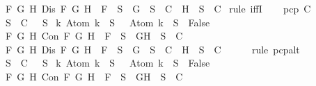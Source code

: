 \begin{isabellebody}
{\isasymand}\ {\isacharparenleft}{\isasymforall}F\ G\ H{\isachardot}\ Dis\ F\ G\ H\ {\isasymlongrightarrow}\ F\ {\isasymin}\ S\ {\isasymlongrightarrow}\ {\isacharbraceleft}G{\isacharbraceright}\ {\isasymunion}\ S\ {\isasymin}\ C\ {\isasymor}\ {\isacharbraceleft}H{\isacharbraceright}\ {\isasymunion}\ S\ {\isasymin}\ C{\isacharparenright}{\isacharparenright}{\isachardoublequoteclose}\isanewline
%
\isadelimproof
%
\endisadelimproof
%
\isatagproof
{}\isamarkupfalse%
\ {\isacharparenleft}rule\ iffI{\isacharparenright}\isanewline
\ \ \isamarkupfalse%
\ {\isachardoublequoteopen}pcp\ C{\isachardoublequoteclose}\isanewline
\ \ \isamarkupfalse%
\ {\isachardoublequoteopen}{\isasymforall}S\ {\isasymin}\ C{\isachardot}\ {\isasymbottom}\ {\isasymnotin}\ S\isanewline
{\isasymand}\ {\isacharparenleft}{\isasymforall}k{\isachardot}\ Atom\ k\ {\isasymin}\ S\ {\isasymlongrightarrow}\ \isactrlbold {\isasymnot}\ {\isacharparenleft}Atom\ k{\isacharparenright}\ {\isasymin}\ S\ {\isasymlongrightarrow}\ False{\isacharparenright}\isanewline
{\isasymand}\ {\isacharparenleft}{\isasymforall}F\ G\ H{\isachardot}\ Con\ F\ G\ H\ {\isasymlongrightarrow}\ F\ {\isasymin}\ S\ {\isasymlongrightarrow}\ {\isacharbraceleft}G{\isacharcomma}H{\isacharbraceright}\ {\isasymunion}\ S\ {\isasymin}\ C{\isacharparenright}\isanewline
{\isasymand}\ {\isacharparenleft}{\isasymforall}F\ G\ H{\isachardot}\ Dis\ F\ G\ H\ {\isasymlongrightarrow}\ F\ {\isasymin}\ S\ {\isasymlongrightarrow}\ {\isacharbraceleft}G{\isacharbraceright}\ {\isasymunion}\ S\ {\isasymin}\ C\ {\isasymor}\ {\isacharbraceleft}H{\isacharbraceright}\ {\isasymunion}\ S\ {\isasymin}\ C{\isacharparenright}{\isachardoublequoteclose}\isanewline
\ \ \ \ \isamarkupfalse%
\ {\isacharparenleft}rule\ pcp{\isacharunderscore}alt{}{\isacharparenright}\isanewline
{}\isamarkupfalse%
\isanewline
\ \ \isamarkupfalse%
\ {\isachardoublequoteopen}{\isasymforall}S\ {\isasymin}\ C{\isachardot}\ {\isasymbottom}\ {\isasymnotin}\ S\isanewline
{\isasymand}\ {\isacharparenleft}{\isasymforall}k{\isachardot}\ Atom\ k\ {\isasymin}\ S\ {\isasymlongrightarrow}\ \isactrlbold {\isasymnot}\ {\isacharparenleft}Atom\ k{\isacharparenright}\ {\isasymin}\ S\ {\isasymlongrightarrow}\ False{\isacharparenright}\isanewline
{\isasymand}\ {\isacharparenleft}{\isasymforall}F\ G\ H{\isachardot}\ Con\ F\ G\ H\ {\isasymlongrightarrow}\ F\ {\isasymin}\ S\ {\isasymlongrightarrow}\ {\isacharbraceleft}G{\isacharcomma}H{\isacharbraceright}\ {\isasymunion}\ S\ {\isasymin}\ C{\isacharparenright}\isanewline

\end{isabellebody}
